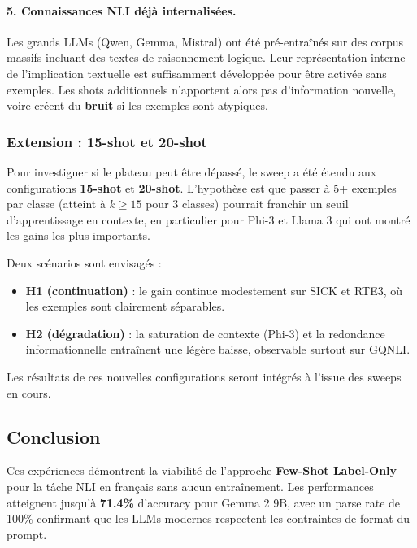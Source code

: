 \paragraph{5. Connaissances NLI déjà internalisées.}
Les grands LLMs (Qwen, Gemma, Mistral) ont été pré-entraînés sur des corpus massifs incluant des textes de raisonnement logique. Leur représentation interne de l'implication textuelle est suffisamment développée pour être activée sans exemples. Les shots additionnels n'apportent alors pas d'information nouvelle, voire créent du \textbf{bruit} si les exemples sont atypiques.

\subsubsection{Extension : 15-shot et 20-shot}

Pour investiguer si le plateau peut être dépassé, le sweep a été étendu aux configurations \textbf{15-shot} et \textbf{20-shot}. L'hypothèse est que passer à 5+ exemples par classe (atteint à $k \geq 15$ pour 3 classes) pourrait franchir un seuil d'apprentissage en contexte, en particulier pour Phi-3 et Llama 3 qui ont montré les gains les plus importants.

Deux scénarios sont envisagés :
\begin{itemize}
    \item \textbf{H1 (continuation)} : le gain continue modestement sur SICK et RTE3, où les exemples sont clairement séparables.
    \item \textbf{H2 (dégradation)} : la saturation de contexte (Phi-3) et la redondance informationnelle entraînent une légère baisse, observable surtout sur GQNLI.
\end{itemize}

Les résultats de ces nouvelles configurations seront intégrés à l'issue des sweeps en cours.

\subsection{Conclusion}

Ces expériences démontrent la viabilité de l'approche \textbf{Few-Shot Label-Only} pour la tâche NLI en français sans aucun entraînement. Les performances atteignent jusqu'à \textbf{71.4\%} d'accuracy pour Gemma 2 9B, avec un parse rate de 100\% confirmant que les LLMs modernes respectent les contraintes de format du prompt.

